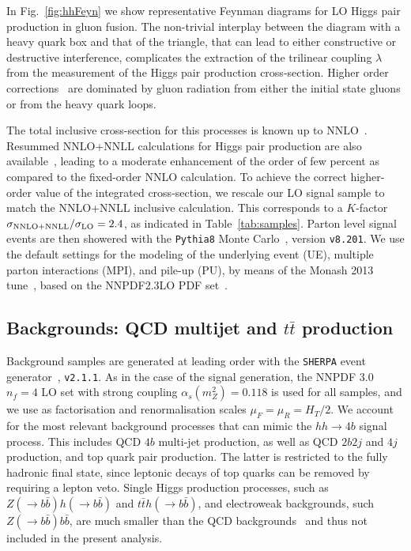 In Fig.~\ref{fig:hhFeyn} we show representative Feynman diagrams
    for LO Higgs pair production in gluon fusion.
    The non-trivial interplay between the diagram with a heavy quark box
    and that of the triangle, that can lead to either
    constructive or destructive interference,
    complicates the extraction of
    the trilinear coupling
    $\lambda$ from the measurement of the Higgs pair
    production cross-section.
    Higher order corrections~\cite{deFlorian:2013jea,Frederix:2014hta}
    are dominated by gluon radiation
    from either the initial state gluons or from the heavy quark loops.

    The total inclusive cross-section for this processes is
    known up to NNLO~\cite{deFlorian:2013jea}.
    Resummed NNLO+NNLL calculations for Higgs pair production are
    also available~\cite{deFlorian:2015moa},
leading to a moderate enhancement of the order of
few percent as compared to the fixed-order NNLO calculation.
%
To achieve the correct higher-order value of the
integrated cross-section, we rescale our LO signal sample to match the
NNLO+NNLL
inclusive calculation.
%
This corresponds to
a $K$-factor $\sigma_{\rm NNLO+NNLL}/\sigma_{\rm LO}=2.4$, as indicated
in Table~\ref{tab:samples}.
%
Parton level signal events are then showered with the {\tt Pythia8} Monte
Carlo~\cite{Sjostrand:2007gs,Sjostrand:2014zea}, version {\tt v8.201}.
%
We use the default settings for the modeling
of the underlying event (UE), multiple parton
interactions (MPI), and pile-up (PU), by means
of the Monash 2013 tune~\cite{Skands:2014pea},
based on the NNPDF2.3LO PDF set~\cite{Ball:2012cx,Ball:2013hta}.
%


\subsection{Backgrounds: QCD multijet and $t\bar{t}$ production}

Background samples are generated at leading order
with the {\tt SHERPA} event generator~\cite{Gleisberg:2008ta}, {\tt v2.1.1}.
%
As in the case of the signal generation,
the NNPDF 3.0 $n_f = 4$ LO set with strong coupling
$\alpha_s(m_Z^2)=0.118$ is used for all samples, and
we use as
factorisation and renormalisation scales $\mu_F=\mu_R=H_T/2$.
%
We account for the most relevant background
processes that can mimic the
 $hh\to 4b$ signal process.
%
This includes  QCD $4b$ multi-jet production, as well as
QCD $2b2j$ and $4j$ production, and top quark pair
production.
%
The latter is restricted to the fully hadronic final state,
since 
leptonic decays of top quarks can be removed by requiring
a lepton veto.
%
Single Higgs production processes, such as $Z(\to b\bar{b})h(\to b\bar{b})$
and $t\bar{t}h(\to b\bar{b})$, and electroweak backgrounds, such $Z(\to b\bar{b})b\bar{b}$,
are much smaller than the QCD backgrounds~\cite{Wardrope:2014kya,deLima:2014dta}
and thus not included in the present analysis.
%



